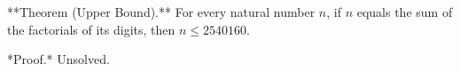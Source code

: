 
**Theorem (Upper Bound).** For every natural number $n$, if $n$ equals the sum of the factorials of its digits, then $n \leq 2540160$.

*Proof.* Unsolved.
